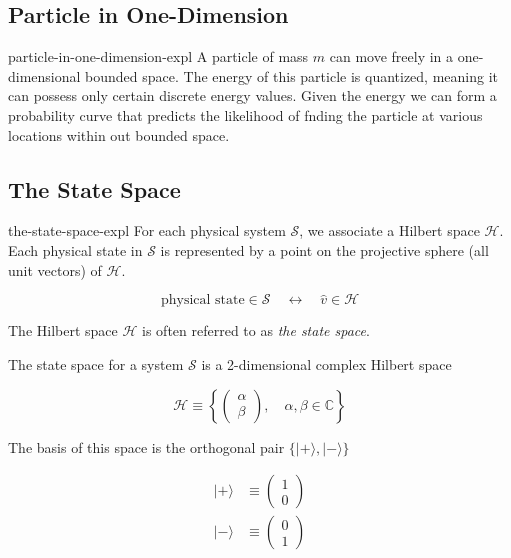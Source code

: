 \documentclass[preview]{standalone}
\begin{document}
\genpage


\subsection{Particle in One-Dimension}

\begin{snippet}{particle-in-one-dimension-expl}
    A particle of mass \(m\) can move freely in a one-dimensional bounded space.
    The energy of this particle is quantized, meaning it can possess only certain discrete energy values.
    Given the energy we can form a probability curve that predicts the likelihood of fnding the particle at various locations within out bounded space.
\end{snippet}

\subsection{The State Space}

\begin{snippet}{the-state-space-expl}
    For each physical system \(\mathscr{S}\), we associate a Hilbert space \(\mathcal{H}\).
    Each physical state in \(\mathscr{S}\) is represented by a point on the projective sphere (all unit vectors) of \(\mathcal{H}\).

    \[
        \text{physical state} \in \mathscr{S} \quad\longleftrightarrow\quad \hat{v} \in \mathcal{H}
    \]

    The Hilbert space \(\mathcal{H}\) is often referred to as \textit{the state space}.

    The state space for a system \(\mathscr{S}\) is a 2-dimensional complex Hilbert space

    \[
        \mathcal{H} \equiv
        \left\{
            \begin{pmatrix}
                \alpha \\
                \beta
            \end{pmatrix}
            ,\quad \alpha ,\beta \in \mathbb{C}
        \right\}
    \]

    The basis of this space is the orthogonal pair \(\{|+\rangle ,|-\rangle\}\)

    \begin{align*}
        |+\rangle &\equiv
        \begin{pmatrix}
            1 \\
            0
        \end{pmatrix} \\
        |-\rangle &\equiv
        \begin{pmatrix}
            0 \\
            1
        \end{pmatrix}
    \end{align*}

\end{snippet}
\end{document}
